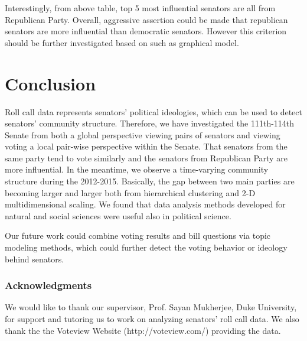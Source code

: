 \documentclass{article} %
\begin{document}
Interestingly, from above table, top 5 most influential senators are all from Republican Party. Overall, aggressive assertion could be made that republican senators are more influential than democratic senators. However this criterion should be further investigated based on such as graphical model.

\section{Conclusion}

Roll call data represents senators' political ideologies, which can be used to detect senators' community structure. Therefore, we have investigated the 111th-114th Senate from both a global perspective viewing pairs of senators and viewing voting a local pair-wise perspective within the Senate. That senators from the same party tend to vote similarly and the senators from Republican Party are more influential. In the meantime, we observe a time-varying community structure during the 2012-2015. Basically, the gap between two main parties are becoming larger and larger both from hierarchical clustering and 2-D multidimensional scaling. We found that data analysis methods developed for natural and social sciences were useful also in political science.

Our future work could combine voting results and bill questions via topic modeling methods, which could further detect the voting behavior or ideology behind senators.

\subsubsection*{Acknowledgments}

We would like to thank our supervisor, Prof. Sayan Mukherjee, Duke University, for support and tutoring us to work on analyzing senators' roll call data. We also thank the the Voteview Website (http://voteview.com/) providing the data.
\end{document}
